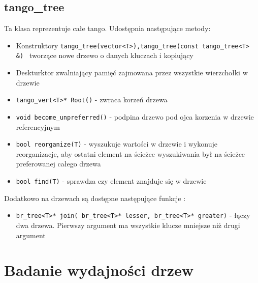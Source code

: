 \documentclass[declaration,shortabstract]{iithesis}
\theoremstyle{thm}
\theoremstyle{remark}
\theoremstyle{plain}
\theoremstyle{plain}
\theoremstyle{plain}
\begin{document}
\section{tango\_tree}

Ta klasa reprezentuje całe tango.  Udostępnia następujące metody: 

\begin{itemize}

\item{Konstruktory \texttt{tango\_tree(vector<T>),tango\_tree(const tango\_tree<T> \&) } tworzące nowe drzewo o danych kluczach i kopiujący}

\item{Deskturktor zwalniający pamięć zajmowana przez wszystkie wierzchołki w drzewie}

\item{\texttt{tango\_vert<T>* Root()} - zwraca korzeń drzewa}

\item{\texttt{void become\_unpreferred()} - podpina drzewo pod ojca korzenia w drzewie referencyjnym}

\item{\texttt{bool reorganize(T)} - wyszukuje wartości w drzewie i wykonuje reorganizacje, aby ostatni element na ścieżce wyszukiwania był na ścieżce preferowanej całego drzewa}

\item{\texttt{bool find(T)} - sprawdza czy element znajduje się w drzewie}
       

\end{itemize}

Dodatkowo na drzewach  są dostępne następujące funkcje : 

\begin{itemize}
\item{\texttt{br\_tree<T>* join( br\_tree<T>* lesser, br\_tree<T>* greater)} - łączy dwa drzewa. Pierwszy argument ma wszystkie klucze mniejsze niż drugi argument}

\end{itemize}

\chapter{Badanie wydajności drzew}
\end{document}
